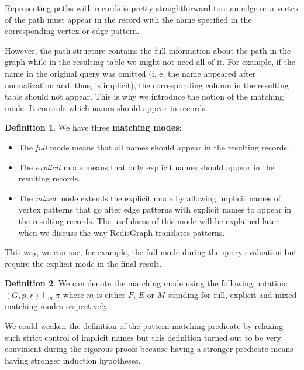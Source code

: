 \documentclass[14pt]{constructor-thesis}
\theoremstyle{definition}
\newtheorem{definition}{Definition}
\begin{document}
Representing paths with records is pretty straightforward too: an edge or a vertex of the path must appear in the record with the name specified in the corresponding vertex or edge pattern.

However, the path structure contains the full information about the path in the graph while in the resulting table we might not need all of it. For example, if the name in the original query was omitted (i. e. the name appeared after normalization and, thus, is implicit), the corresponding column in the resulting table should not appear. This is why we introduce the notion of the matching mode. It controls which names should appear in records.

\begin{definition}
  We have three \textbf{matching modes}:
  \begin{itemize}
    \item The \textit{full} mode means that all names should appear in the resulting records.
    \item The \textit{explicit} mode means that only explicit names should appear in the resulting records.
    \item The \textit{mixed} mode extends the explicit mode by allowing implicit names of vertex patterns that go after edge patterns with explicit names to appear in the resulting records. The usefulness of this mode will be explained later when we discuss the way RedisGraph translates patterns.
  \end{itemize} 
\end{definition}

This way, we can use, for example, the full mode during the query evaluation but require the explicit mode in the final result.

\begin{definition}
  We can denote the matching mode using the following notation:
  $ (G, p, r) \models_m \pi $
  where $m$ is either $F$, $E$ or $M$ standing for full, explicit and mixed matching modes respectively.
\end{definition}

We could weaken the definition of the pattern-matching predicate by relaxing such strict control of implicit names but this definition turned out to be very convinient during the rigorous proofs because having a stronger predicate means having stronger induction hypotheses.
\end{document}
